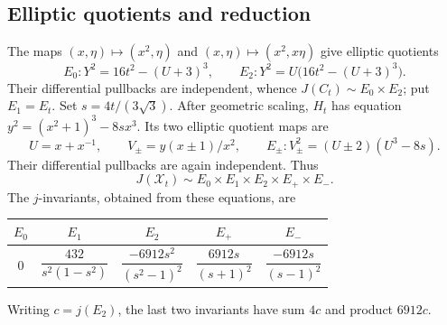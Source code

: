 \documentclass[11pt]{article}
\theoremstyle{remark}
\begin{document}
\subsection{Elliptic quotients and reduction}

The maps \((x,\eta)\mapsto(x^2,\eta)\) and
\((x,\eta)\mapsto(x^2,x\eta)\) give elliptic quotients
\[
 E_0:Y^2=16t^2-(U+3)^3,\qquad
 E_2:Y^2=U\bigl(16t^2-(U+3)^3\bigr).
\]
Their differential pullbacks are independent, whence
\(J(C_t)\sim E_0\times E_2\); put \(E_1=E_t\).
Set \(s=4t/(3\sqrt3)\). After geometric scaling, \(H_t\) has equation
\(y^2=(x^2+1)^3-8sx^3\). Its two elliptic quotient maps are
\[
 U=x+x^{-1},\qquad V_\pm=y(x\pm1)/x^2,
 \qquad E_\pm:V_\pm^2=(U\pm2)(U^3-8s).
\]
Their differential pullbacks are again independent. Thus
\begin{equation}
 J(\mathcal X_t)\sim E_0\times E_1\times E_2\times E_+\times E_-.
 \label{eq:pencil-five-factors}
\end{equation}
The \(j\)-invariants, obtained from these equations, are
\begin{center}
\begin{tabular}{@{}ccccc@{}}
\toprule
\(E_0\)&\(E_1\)&\(E_2\)&\(E_+\)&\(E_-\)\\
\midrule
\(0\)&\(\dfrac{432}{s^2(1-s^2)}\)&
\(\dfrac{-6912s^2}{(s^2-1)^2}\)&
\(\dfrac{6912s}{(s+1)^2}\)&\(\dfrac{-6912s}{(s-1)^2}\)\\
\bottomrule
\end{tabular}
\end{center}
Writing \(c=j(E_2)\), the last two invariants have sum \(4c\) and product
\(6912c\).
\end{document}
